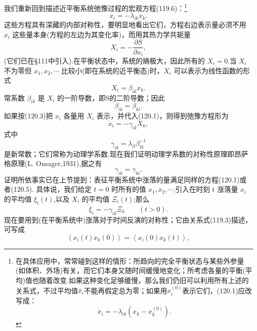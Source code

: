 我们重新回到描述近平衡系统弛豫过程的宏观方程(119.6)：\footnote{在具体应用中，常常碰到这样的情形：所趋向的完全平衡状态与某些外参量(如体积、外场)有关，而它们本身又随时间缓慢地变化；所考虑各量的平衡(平均)值也随着改变.如果这种变化足够缓慢，那么我们仍旧可以利用所有上述的关系式，不过平均值$\bar{x}_i$不能再假定总为零；如果用$x_i^{(0)}$表示它们，(120.1)应改写成：
\begin{equation}
  \dot{x}_i=-\lambda_{ik}(x_k-x_k^{(0)}).\tag{120.2a}
\end{equation}}
\begin{equation}
  \dot{x}_i=-\lambda_{ik}x_k.
\end{equation}
这些方程具有深藏的内部对称性，要明显地看出它们，方程右边表示量必须不用 $x_i$ 这些量本身(方程的左边为其变化率)，而用其热力学共轭量
\begin{equation}
  X_i=-\frac{\partial S}{\partial x_i},
\end{equation}
(它们已在§111中引入).在平衡状态中，系统的熵极大，因此所有的 $X_i=0$.当 $X_i$ 不为零但 $x_1,x_2,\cdots$ 比较小(即在系统的近平衡态)时，$X_i$ 可以表示为线性函数的形式
\begin{equation}
  X_i=\beta_{ik}x_k.
\end{equation}
常系数 $\beta_{ik}$ 是 $X_i$ 的一阶导数，即S的二阶导数；因此
\begin{equation}
  \beta_{ik}=\beta_{ki}.
\end{equation}
如果按(120.3)把 $x_i$ 各量用 $X_i$ 表示，并代入(120.1)，则得到弛豫方程形为
\begin{equation}
  \dot{x}_i=-\gamma_{ik}X_k,
\end{equation}
式中
\begin{equation}
  \gamma_{ik}=\lambda_{il}\beta^{-1}_{lk}
\end{equation}
是新常数；它们常称为动理学系数.现在我们证明动理学系数的对称性原理即昂萨格原理(L. Onsager,1931),据之有
\begin{equation}
  \gamma_{ik}=\gamma_{ki}.
\end{equation}
证明所依事实已在上节提到：表征平衡系统中涨落的量满足同样的方程(120.1)或者(120.5). 具体说，我们给定 $t=0$ 时所有的值 $x_1,x_2,\cdots$,引入在时刻 t 涨落量 $x_i$ 的平均值 $\xi_i(t)$,以及 $X_i$ 的平均值 $\Xi_i(t)$;那么
\begin{equation}
  \dot{\xi}_i=-\gamma_{ik}\Xi_k\qquad(t>0).
\end{equation}
现在要用到(在平衡系统中)涨落对于时间反演的对称性；它由关系式(119.3)描述，可写成
\begin{equation}
  \left\langle x_i(t)x_k(0)\right\rangle=\left\langle x_i(0)x_k(t)\right\rangle,
\end{equation}
